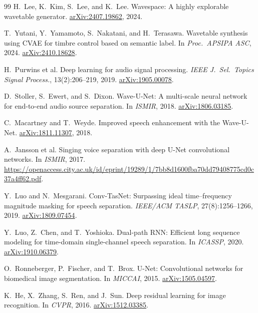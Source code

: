 \documentclass[10pt,twocolumn,letterpaper]{article}
\theoremstyle{remark}
\begin{document}
{\begin{thebibliography}{99}
H.~Lee, K.~Kim, S.~Lee, and K.~Lee.
\newblock Wavespace: A highly explorable wavetable generator.
\newblock \href{https://arxiv.org/abs/2407.19862}{arXiv:2407.19862}, 2024.

T.~Yutani, Y.~Yamamoto, S.~Nakatani, and H.~Terasawa.
\newblock Wavetable synthesis using CVAE for timbre control based on semantic label.
\newblock In \emph{Proc.\ APSIPA ASC}, 2024.
\newblock \href{https://arxiv.org/abs/2410.18628}{arXiv:2410.18628}.

H.~Purwins et al.
\newblock Deep learning for audio signal processing.
\newblock \emph{IEEE J.\ Sel.\ Topics Signal Process.}, 13(2):206--219, 2019.
\newblock \href{https://arxiv.org/abs/1905.00078}{arXiv:1905.00078}.

D.~Stoller, S.~Ewert, and S.~Dixon.
\newblock Wave-U-Net: A multi-scale neural network for end-to-end audio source separation.
\newblock In \emph{ISMIR}, 2018.
\newblock \href{https://arxiv.org/abs/1806.03185}{arXiv:1806.03185}.

C.~Macartney and T.~Weyde.
\newblock Improved speech enhancement with the Wave-U-Net.
\newblock \href{https://arxiv.org/abs/1811.11307}{arXiv:1811.11307}, 2018.

A.~Jansson et al.
\newblock Singing voice separation with deep U-Net convolutional networks.
\newblock In \emph{ISMIR}, 2017.
\newblock \url{https://openaccess.city.ac.uk/id/eprint/19289/1/7bb8d1600fba70dd79408775cd0c37a4ff62.pdf}.

Y.~Luo and N.~Mesgarani.
\newblock Conv-TasNet: Surpassing ideal time--frequency magnitude masking for speech separation.
\newblock \emph{IEEE/ACM TASLP}, 27(8):1256--1266, 2019.
\newblock \href{https://arxiv.org/abs/1809.07454}{arXiv:1809.07454}.

Y.~Luo, Z.~Chen, and T.~Yoshioka.
\newblock Dual-path RNN: Efficient long sequence modeling for time-domain single-channel speech separation.
\newblock In \emph{ICASSP}, 2020.
\newblock \href{https://arxiv.org/abs/1910.06379}{arXiv:1910.06379}.

O.~Ronneberger, P.~Fischer, and T.~Brox.
\newblock U-Net: Convolutional networks for biomedical image segmentation.
\newblock In \emph{MICCAI}, 2015.
\newblock \href{https://arxiv.org/abs/1505.04597}{arXiv:1505.04597}.

K.~He, X.~Zhang, S.~Ren, and J.~Sun.
\newblock Deep residual learning for image recognition.
\newblock In \emph{CVPR}, 2016.
\newblock \href{https://arxiv.org/abs/1512.03385}{arXiv:1512.03385}.


\end{thebibliography}}
\end{document}
